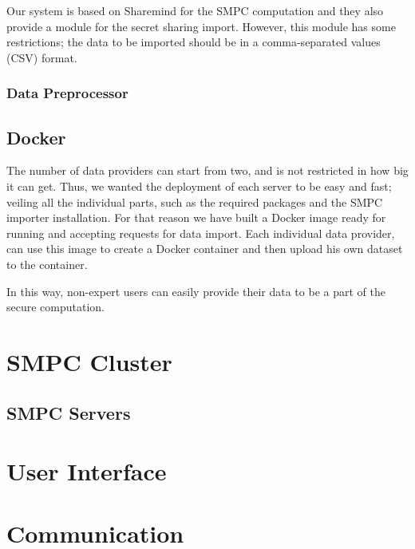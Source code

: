 Our system is based on Sharemind for the SMPC computation and they also provide a module for the secret sharing import.
However, this module has some restrictions; the data to be imported should be in a comma-separated values (CSV) format.



\subsubsection{Data Preprocessor}\label{sss:data-providers-preprocessor}




\subsection{Docker}\label{ss:data-providers-docker}
The number of data providers can start from two, and is not restricted in how big it can get.
Thus, we wanted the deployment of each server to be easy and fast; veiling all the individual parts, such as the required packages and the SMPC importer installation.
For that reason we have built a Docker image ready for running and accepting requests for data import.
Each individual data provider, can use this image to create a Docker container and then upload his own dataset to the container.

In this way, non-expert users can easily provide their data to be a part of the secure computation.



\section{SMPC Cluster}\label{s:impl-smpc-cluster}

\subsection{SMPC Servers}\label{ss:smpc-cluster-servers}





\section{User Interface}\label{s:impl-ui}




\section{Communication}\label{s:impl-communication}


